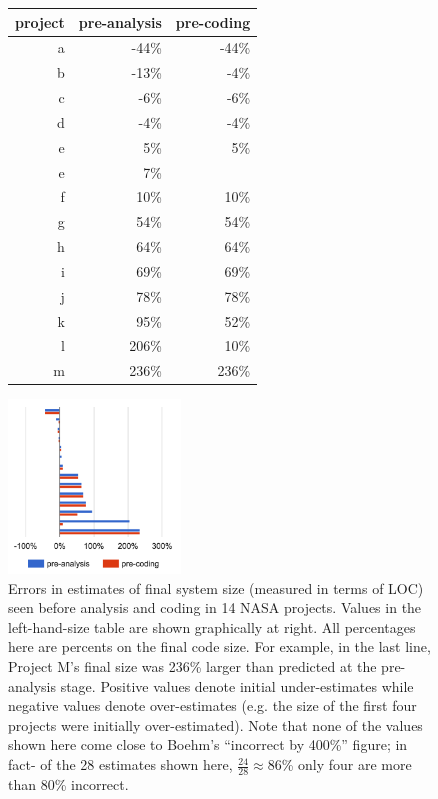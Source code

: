 \documentclass[final,twocolumn,5p]{elsarticle}
\begin{document}
    \begin{figure}
      \scriptsize
      \begin{minipage}{.5\linewidth}
      \begin{tabular}{r|rr|}
   project & pre-analysis&pre-coding\\\hline
a&-44\%&-44\%\\
b&-13\%&-4\%\\
c&-6\%&-6\%\\
d&-4\%&-4\%\\
e&5\%&5\%\\
e&7\%&\\
f&10\%&10\%\\
g&54\%&54\%\\
h&64\%&64\%\\
i&69\%&69\%\\
j&78\%&78\%\\
k&95\%&52\%\\
l&206\%&10\%\\
m&236\%&236\%
      \end{tabular}\end{minipage} \begin{minipage}{.33\linewidth}
        \includegraphics[width=1.8in]{nasadata.png}
        \end{minipage}
      \caption{Errors in estimates of final system size (measured in terms of LOC)
        seen before analysis and coding in 14 NASA projects. Values in the left-hand-size table
        are shown graphically at right.
        All percentages here are percents on the final code size. For example, in the last
        line, Project M's final size was 236\% larger than predicted at the pre-analysis stage.
        Positive values denote initial under-estimates while negative values denote over-estimates
        (e.g. the size of the first four projects were initially over-estimated). Note
        that none of the values shown here come close to Boehm's ``incorrect by 400\%'' figure;
        in fact- of the 28 estimates shown here, $\frac{24}{28}\approx 86$\%
        only four are more than 80\% incorrect.}
        \label{fig:loc}
    \end{figure}
\end{document}
